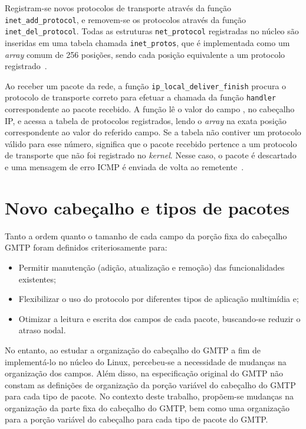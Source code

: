 Registram-se novos protocolos de transporte através da função \lstinline|inet_add_protocol|, e removem-se os protocolos através da função \lstinline|inet_del_protocol|. 
Todas as estruturas \lstinline|net_protocol| registradas no núcleo são inseridas em uma tabela chamada \lstinline|inet_protos|, que é implementada como um \textit{array} comum de 256 posições, sendo cada posição equivalente a um protocolo registrado~\cite{Benvenuti:2005:ULN:1162208}.

Ao receber um pacote da rede, a função \lstinline|ip_local_deliver_finish| procura o protocolo de transporte correto para efetuar a chamada da função \lstinline|handler| correspondente ao pacote recebido. 
A função lê o valor do campo , no cabeçalho IP, e acessa a tabela de protocolos registrados, lendo o \textit{array} na exata posição correspondente ao valor do referido campo.
Se a tabela não contiver um protocolo válido para esse número, significa que o pacote recebido pertence a um protocolo de transporte que não foi registrado no \textit{kernel}. Nesse caso, o pacote é descartado e uma mensagem de erro ICMP é enviada de volta ao remetente~\cite{Benvenuti:2005:ULN:1162208}.

\section{Novo cabeçalho e tipos de pacotes}
\label{sec:impl_header}

Tanto a ordem quanto o tamanho de cada campo da porção fixa do cabeçalho GMTP foram definidos criteriosamente para:
\begin{itemize}
	\item Permitir manutenção (adição, atualização e remoção) das funcionalidades existentes;
	\item Flexibilizar o uso do protocolo por diferentes tipos de aplicação multimídia e;
	\item Otimizar a leitura e escrita dos campos de cada pacote, buscando-se reduzir o atraso nodal.
\end{itemize}

No entanto, ao estudar a organização do cabeçalho do GMTP a fim de implementá-lo no núcleo do Linux, percebeu-se a necessidade de mudanças na organização dos campos. Além disso, na especificação original do GMTP não constam as definições de organização da porção variável do cabeçalho do GMTP para cada tipo de pacote. No contexto deste trabalho, propõem-se mudanças na organização da parte fixa do cabeçalho do GMTP, bem como uma organização para a porção variável do cabeçalho para cada tipo de pacote do GMTP.

